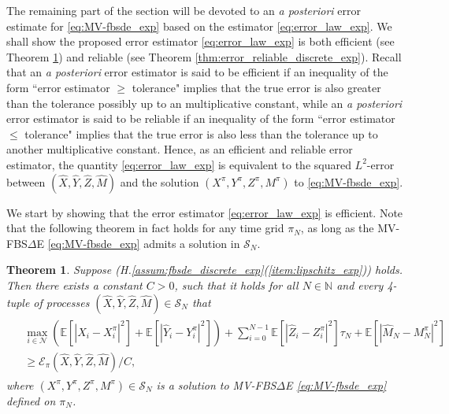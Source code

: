 \documentclass[11pt]{article}
\numberwithin{equation}{section}
\newtheorem{Theorem}{Theorem}[section]
\theoremstyle{definition}
\theoremstyle{remark}
\def\l{\label}  \def\f{\frac}  \def\fa{\forall}
\def\cE{\mathcal{E}}
\def\cN{\mathcal{N}}
\def\cS{\mathcal{S}}
\def\sE{{\mathbb{E}}}
\def\sN{{\mathbb{N}}}
\newcommand{\fbsde}{FBS$\Delta$E }
\begin{document}
The remaining part of the section will be devoted to
an \textit{a posteriori} error estimate for \eqref{eq:MV-fbsde_exp}
based on the estimator \eqref{eq:error_law_exp}.
We shall show 
the proposed error estimator  \eqref{eq:error_law_exp} 
is both 
 efficient (see Theorem \ref{thm:error_efficient_discrete_exp})
and reliable 
(see Theorem \ref{thm:error_reliable_discrete_exp}).
Recall that  an
\textit{a posteriori} error estimator is   said to be efficient 
if an inequality of
the form ``error estimator $\ge$ tolerance" implies that the true error is
also greater than the tolerance possibly up to an multiplicative
constant,
while an
 \textit{a posteriori} error estimator is said to be reliable if 
 an inequality of the form ``error
estimator $\le$ tolerance" implies that the true error is also less than the
tolerance up to another multiplicative constant.
Hence, as an efficient and reliable  error estimator,
the quantity \eqref{eq:error_law_exp} is equivalent to the squared $L^2$-error between $(\hat{X},\hat{Y},\hat{Z}, \hat{M})$ and 
the solution $(X^\pi,Y^\pi, Z^\pi, M^\pi)$ to \eqref{eq:MV-fbsde_exp}.




We start by showing that the  error estimator \eqref{eq:error_law_exp} is  efficient.
Note that the following theorem in fact holds for any  time grid $\pi_N$,
as long as the MV-\fbsde \eqref{eq:MV-fbsde_exp} admits a solution in $\cS_N$.




\begin{Theorem}\l{thm:error_efficient_discrete_exp}
Suppose (H.\ref{assum:fbsde_discrete_exp}(\ref{item:lipschitz_exp})) 
holds. Then there exists a constant $C>0$,
such that
it holds for all  
$N\in\sN$ and every
 4-tuple of processes 
$(\hat{X},\hat{Y},\hat{Z}, \hat{M})\in \cS_N$
that
\begin{align*}
\begin{split}
&\max_{i\in \cN}
\left(
\sE[|\hat{X}_{i}
-{X}^\pi_{i}|^2]
+
\sE[|\hat{Y}_{i}
-{Y}^\pi_{i}|^2]
\right)
+
\sum_{i=0}^{N-1}
\sE
[
|\hat{Z}_{i}
-{Z}^\pi_{i}|^2]\tau_N
+
\sE[|\hat{M}_{N}
-{M}^\pi_{N}|^2]
\\
&\ge
\cE_\pi(\hat{X},\hat{Y},\hat{Z}, \hat{M})/C,
\end{split}
\end{align*}
where $(X^\pi,Y^\pi, Z^\pi, M^\pi)\in \cS_N$
is a solution to MV-\fbsde \eqref{eq:MV-fbsde_exp}
defined on $\pi_N$. 

\end{Theorem}
\end{document}

